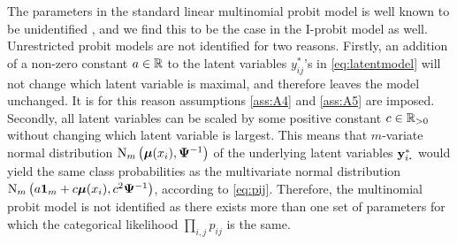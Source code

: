 The parameters in the standard linear multinomial probit model is well known to be unidentified \citep{Keane1992,train2009discrete}, and we find this to be the case in the I-probit model as well.
Unrestricted probit models are not identified for two reasons.
Firstly, an addition of a non-zero constant $a\in\mathbb{R}$ to the latent variables $y_{ij}^*$'s in \cref{eq:latentmodel} will not change which latent variable is maximal, and therefore leaves the model unchanged.
It is for this reason assumptions \ref{ass:A4} and \ref{ass:A5} are imposed.
Secondly, all latent variables can be scaled by some positive constant $c\in\mathbb{R}_{>0}$ without changing which latent variable is largest.
This means that $m$-variate normal distribution $\operatorname{N}_m\big({\bm\mu}(x_i), {\bm\Psi}^{-1}\big)$ of the underlying latent variables $\by_{i\bigcdot}^*$ would yield the same class probabilities as the multivariate normal distribution $\operatorname{N}_m\big( a{\mathbf 1}_m + c{\bm\mu}(x_i), c^2{\bm\Psi}^{-1} \big)$, according to \cref{eq:pij}.
Therefore, the multinomial probit model is not identified as there exists more than one set of parameters for which the categorical likelihood $\prod_{i,j} p_{ij}$ is the same.

